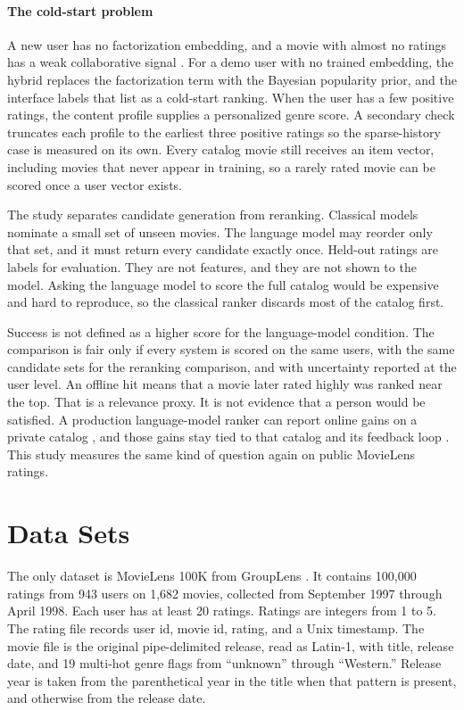 \documentclass[conference]{IEEEtran}
\begin{document}
\paragraph{The cold-start problem}
A new user has no factorization embedding, and a movie with almost no ratings has a weak collaborative signal \cite{burke2002,yao2014}. For a demo user with no trained embedding, the hybrid replaces the factorization term with the Bayesian popularity prior, and the interface labels that list as a cold-start ranking. When the user has a few positive ratings, the content profile supplies a personalized genre score. A secondary check truncates each profile to the earliest three positive ratings so the sparse-history case is measured on its own. Every catalog movie still receives an item vector, including movies that never appear in training, so a rarely rated movie can be scored once a user vector exists.

The study separates candidate generation from reranking. Classical models nominate a small set of unseen movies. The language model may reorder only that set, and it must return every candidate exactly once. Held-out ratings are labels for evaluation. They are not features, and they are not shown to the model. Asking the language model to score the full catalog would be expensive and hard to reproduce, so the classical ranker discards most of the catalog first.

Success is not defined as a higher score for the language-model condition. The comparison is fair only if every system is scored on the same users, with the same candidate sets for the reranking comparison, and with uncertainty reported at the user level. An offline hit means that a movie later rated highly was ranked near the top. That is a relevance proxy. It is not evidence that a person would be satisfied. A production language-model ranker can report online gains on a private catalog \cite{li2026}, and those gains stay tied to that catalog and its feedback loop \cite{bennett2007,herlocker2004}. This study measures the same kind of question again on public MovieLens ratings.

\section{Data Sets}
The only dataset is MovieLens 100K from GroupLens \cite{harper2015}. It contains 100{,}000 ratings from 943 users on 1{,}682 movies, collected from September 1997 through April 1998. Each user has at least 20 ratings. Ratings are integers from 1 to 5. The rating file records user id, movie id, rating, and a Unix timestamp. The movie file is the original pipe-delimited release, read as Latin-1, with title, release date, and 19 multi-hot genre flags from ``unknown'' through ``Western.'' Release year is taken from the parenthetical year in the title when that pattern is present, and otherwise from the release date.
\end{document}
